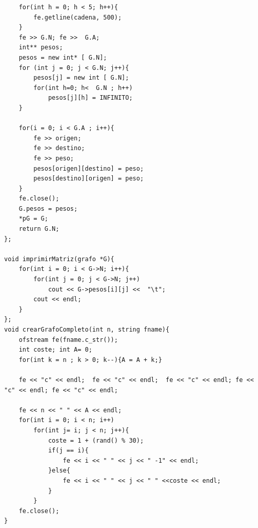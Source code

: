 \documentclass[es]{ifirak}
\begin{document}
\begin{lstlisting}
	for(int h = 0; h < 5; h++){
		fe.getline(cadena, 500);
	}
	fe >> G.N; fe >>  G.A;
	int** pesos;
	pesos = new int* [ G.N]; 
	for (int j = 0; j < G.N; j++){   
		pesos[j] = new int [ G.N]; 
		for(int h=0; h<  G.N ; h++)
			pesos[j][h] = INFINITO;
	}
	
	for(i = 0; i < G.A ; i++){
		fe >> origen;
		fe >> destino;
		fe >> peso;
		pesos[origen][destino] = peso;
		pesos[destino][origen] = peso;
	}
	fe.close();
	G.pesos = pesos;
	*pG = G;
	return G.N;
};

void imprimirMatriz(grafo *G){
	for(int i = 0; i < G->N; i++){
		for(int j = 0; j < G->N; j++)
			cout << G->pesos[i][j] <<  "\t";  
		cout << endl;
	}
};
void crearGrafoCompleto(int n, string fname){
	ofstream fe(fname.c_str());
	int coste; int A= 0;
	for(int k = n ; k > 0; k--){A = A + k;}
	
	fe << "c" << endl;  fe << "c" << endl;  fe << "c" << endl; fe << "c" << endl; fe << "c" << endl;
	
	fe << n << " " << A << endl;
	for(int i = 0; i < n; i++)
		for(int j= i; j < n; j++){
			coste = 1 + (rand() % 30);
			if(j == i){
				fe << i << " " << j << " -1" << endl;
			}else{
				fe << i << " " << j << " " <<coste << endl;
			}
		}           
	fe.close();
}
\end{lstlisting}
\end{document}
